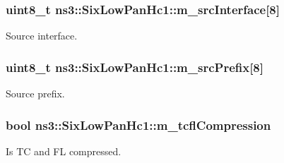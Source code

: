 \subsubsection[{\texorpdfstring{m\+\_\+src\+Interface}{m_srcInterface}}]{\setlength{\rightskip}{0pt plus 5cm}uint8\+\_\+t ns3\+::\+Six\+Low\+Pan\+Hc1\+::m\+\_\+src\+Interface\mbox{[}8\mbox{]}\hspace{0.3cm}{\ttfamily [private]}}\hypertarget{classns3_1_1SixLowPanHc1_a2b947076c7588c931ad13825c055d1c5}{}\label{classns3_1_1SixLowPanHc1_a2b947076c7588c931ad13825c055d1c5}


Source interface. 

\subsubsection[{\texorpdfstring{m\+\_\+src\+Prefix}{m_srcPrefix}}]{\setlength{\rightskip}{0pt plus 5cm}uint8\+\_\+t ns3\+::\+Six\+Low\+Pan\+Hc1\+::m\+\_\+src\+Prefix\mbox{[}8\mbox{]}\hspace{0.3cm}{\ttfamily [private]}}\hypertarget{classns3_1_1SixLowPanHc1_a788a1b87fea6ebcec096c0092c2a6d6d}{}\label{classns3_1_1SixLowPanHc1_a788a1b87fea6ebcec096c0092c2a6d6d}


Source prefix. 

\subsubsection[{\texorpdfstring{m\+\_\+tcfl\+Compression}{m_tcflCompression}}]{\setlength{\rightskip}{0pt plus 5cm}bool ns3\+::\+Six\+Low\+Pan\+Hc1\+::m\+\_\+tcfl\+Compression\hspace{0.3cm}{\ttfamily [private]}}\hypertarget{classns3_1_1SixLowPanHc1_a4fe472128dbc9ea4a3c5aea72e391f03}{}\label{classns3_1_1SixLowPanHc1_a4fe472128dbc9ea4a3c5aea72e391f03}


Is TC and FL compressed. 

